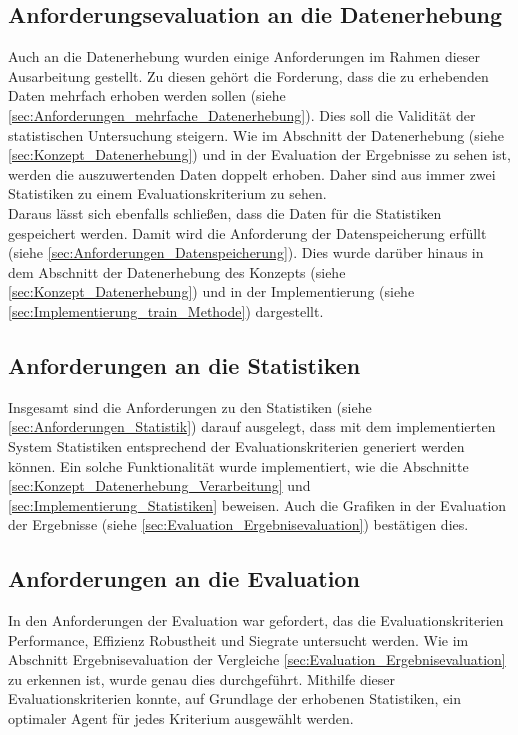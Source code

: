 \subsection{Anforderungsevaluation an die Datenerhebung} \label{sec:Evaluation_Datenerhebung}
Auch an die Datenerhebung wurden einige Anforderungen im Rahmen dieser Ausarbeitung gestellt. Zu diesen gehört die Forderung, dass die zu erhebenden Daten mehrfach erhoben werden sollen 
(siehe \ref{sec:Anforderungen_mehrfache_Datenerhebung}). Dies soll die Validität der statistischen Untersuchung steigern. Wie im Abschnitt der Datenerhebung (siehe \ref{sec:Konzept_Datenerhebung}) und in der Evaluation der Ergebnisse zu sehen ist, werden die auszuwertenden Daten doppelt erhoben. Daher sind aus immer zwei Statistiken zu einem Evaluationskriterium zu sehen.\\
Daraus lässt sich ebenfalls schließen, dass die Daten für die Statistiken gespeichert werden. Damit wird die Anforderung der Datenspeicherung erfüllt (siehe \ref{sec:Anforderungen_Datenspeicherung}). Dies wurde darüber hinaus in dem Abschnitt der Datenerhebung des Konzepts (siehe \ref{sec:Konzept_Datenerhebung}) und in der Implementierung (siehe \ref{sec:Implementierung_train_Methode}) dargestellt.

\subsection{Anforderungen an die Statistiken}
Insgesamt sind die Anforderungen zu den Statistiken (siehe \ref{sec:Anforderungen_Statistik}) darauf ausgelegt, dass mit dem implementierten System Statistiken entsprechend der Evaluationskriterien generiert werden können. Ein solche Funktionalität wurde implementiert, wie die Abschnitte \ref{sec:Konzept_Datenerhebung_Verarbeitung} und \ref{sec:Implementierung_Statistiken} beweisen. Auch die Grafiken in der Evaluation der Ergebnisse (siehe \ref{sec:Evaluation_Ergebnisevaluation}) bestätigen dies.

\subsection{Anforderungen an die Evaluation}
In den Anforderungen der Evaluation war gefordert, das die Evaluationskriterien Performance, Effizienz Robustheit und Siegrate untersucht werden. Wie im Abschnitt Ergebnisevaluation der Vergleiche \ref{sec:Evaluation_Ergebnisevaluation} zu erkennen ist, wurde genau dies durchgeführt. Mithilfe dieser Evaluationskriterien konnte, auf Grundlage der erhobenen Statistiken, ein optimaler Agent für jedes Kriterium ausgewählt werden.